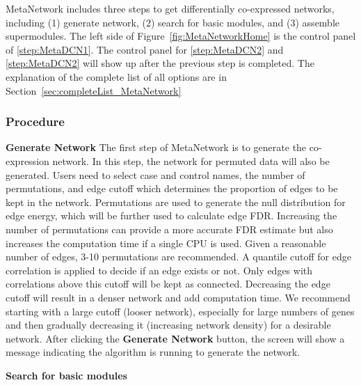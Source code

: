MetaNetwork includes three steps to get differentially co-expressed networks,
including (1) generate network, (2) search for basic modules, and (3) assemble supermodules. 
The left side of Figure~\ref{fig:MetaNetworkHome} is the control panel of \ref{step:MetaDCN1}. 
The control panel for \ref{step:MetaDCN2} and \ref{step:MetaDCN2} will show up after the previous step is completed.
The explanation of the complete list of all options are in Section~\ref{sec:completeList_MetaNetwork}


\subsubsection{Procedure}

\begin{steps}
\item \textbf{Generate Network}
\label{step:MetaDCN1}
The first step of MetaNetwork is to generate the co-expression network. 
In this step, the network for permuted data will also be generated. 
Users need to select case and control names, the number of permutations, and edge cutoff which determines the proportion of edges to be kept in the network. 
Permutations are used to generate the null distribution for edge energy, 
which will be further used to calculate edge FDR. 
Increasing the number of permutations can provide a more accurate FDR estimate but also increases the computation time if a single CPU is used. 
Given a reasonable number of edges, 3-10 permutations are recommended.
A quantile cutoff for edge correlation is applied to decide if an edge exists or not. 
Only edges with correlations above this cutoff will be kept as connected. 
Decreasing the edge cutoff will result in a denser network and add computation time. 
We recommend starting with a large cutoff (looser network), 
especially for large numbers of genes and then gradually decreasing it (increasing network density) for a desirable network.
After clicking the \textbf{Generate Network} button,
the screen will show a message indicating the algorithm is running to generate the network.

\item \textbf{Search for basic modules}
\label{step:MetaDCN2}


\end{steps}
